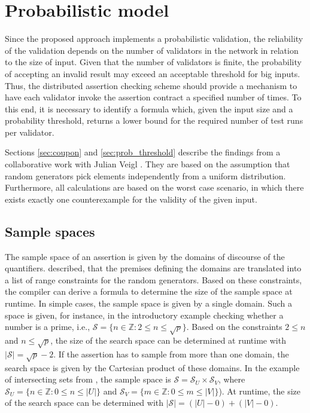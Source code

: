 \chapter{Probabilistic model}\label{chap:prob_model}
Since the proposed approach implements a probabilistic validation, the reliability of the validation depends on the number of validators in the network in relation to the size of input. Given that the number of validators is finite, the probability of accepting an invalid result may exceed an acceptable threshold for big inputs. Thus, the distributed assertion checking scheme should provide a mechanism to have each validator invoke the assertion contract a specified number of times. To this end, it is necessary to identify a formula which, given the input size and a probability threshold, returns a lower bound for the required number of test runs per validator. 

Sections \ref{sec:coupon} and \ref{sec:prob_threshold} describe the findings from a collaborative work with Julian Veigl \cite{bernhardt_veigel_2020}. They are based on the assumption that random generators pick elements independently from a uniform distribution. Furthermore, all calculations are based on the worst case scenario, in which there exists exactly one counterexample for the validity of the given input.

\section{Sample spaces}\label{sec:sample_space}
The sample space of an assertion is given by the domains of discourse of the quantifiers.  described, that the premises defining the domains are translated into a list of range constraints for the random generators. Based on these constraints, the compiler can derive a formula to determine the size of the sample space at runtime. In simple cases, the sample space is given by a single domain. Such a space is given, for instance, in the introductory example checking whether a number is a prime, i.e., $\mathcal{S} = \lbrace n \in\mathbb{Z} : 2 \le n \le \sqrt{p} \rbrace$. Based on the constraints $2 \le n$ and $n \le \sqrt{p}$, the size of the search space can be determined at runtime with $|\mathcal{S}| = \sqrt{p} - 2$. If the assertion has to sample from more than one domain, the search space is given by the Cartesian product of these domains. In the example of intersecting sets from , the sample space is $\mathcal{S} = \mathcal{S}_U \times \mathcal{S}_V$, where $\mathcal{S}_U = \lbrace n \in\mathbb{Z} : 0 \leq n \le |U| \rbrace$ and $\mathcal{S}_V = \lbrace m \in\mathbb{Z} : 0 \leq m \le |V| \rbrace$). At runtime, the size of the search space can be determined with $|\mathcal{S}| = (|U| - 0) + (|V| - 0)$.


